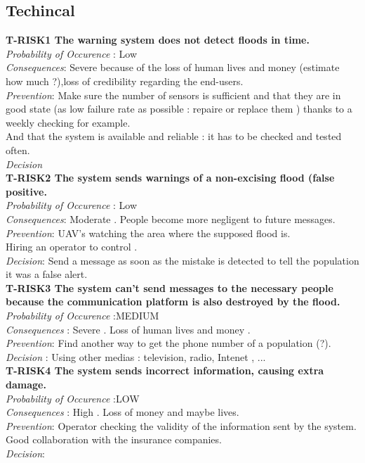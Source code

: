 \subsection{Techincal}

	\textbf{ T-RISK1 The warning system does not detect floods in time.} \\
	\textit{Probability of Occurence} : Low \\ %
	\textit{Consequences}: Severe because of the loss of human lives and money (estimate how much ?),loss of credibility regarding the end-users.\\
	\textit{Prevention}: Make sure the number of sensors is sufficient and that they are in good state (as low failure rate as possible : repaire or replace them ) thanks to a weekly checking for example. \\
	And that the system is available and reliable : it has to be checked and tested often.\\
	\textit{Decision} \\
	

	\textbf{ T-RISK2 The system sends warnings of a non-excising flood (false positive.} \\
	\textit{Probability of Occurence} : Low \\
	\textit{Consequences}: Moderate . People become more negligent to future messages. \\
	\textit{Prevention}: UAV's watching the area where the supposed flood is.\\
	Hiring an operator to control . \\
	\textit{Decision}: Send a message as soon as the mistake is detected to tell the population it was a false alert. \\
	

	\textbf{ T-RISK3 The system can't send messages to the necessary people because the communication platform is also destroyed by the flood.} \\
	\textit{Probability of Occurence} :MEDIUM\\
	\textit{Consequences} : Severe . Loss of human lives and money .\\
	\textit{Prevention}: Find another way to get the phone number of a population (?). \\
	\textit{Decision} : Using other medias : television, radio, Intenet , ... \\
	

	\textbf{ T-RISK4 The system sends incorrect information, causing extra damage.} \\
	\textit{Probability of Occurence} :LOW\\
	\textit{Consequences} : High . Loss of money and maybe lives.\\
	\textit{Prevention}: Operator checking the validity of the information sent by the system.\\
	Good collaboration with the insurance companies. \\
	\textit{Decision}: \\


